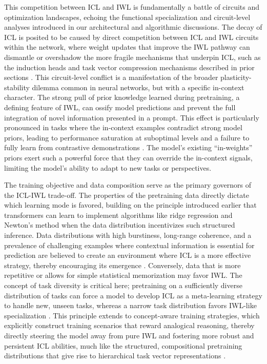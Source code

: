 \documentclass[11pt]{article}
\begin{document}
This competition between ICL and IWL is fundamentally a battle of circuits and optimization landscapes, echoing the functional specialization and circuit-level analyses introduced in our architectural and algorithmic discussions. The decay of ICL is posited to be caused by direct competition between ICL and IWL circuits within the network, where weight updates that improve the IWL pathway can dismantle or overshadow the more fragile mechanisms that underpin ICL, such as the induction heads and task vector compression mechanisms described in prior sections \cite{ref73}. This circuit-level conflict is a manifestation of the broader plasticity-stability dilemma common in neural networks, but with a specific in-context character. The strong pull of prior knowledge learned during pretraining, a defining feature of IWL, can ossify model predictions and prevent the full integration of novel information presented in a prompt. This effect is particularly pronounced in tasks where the in-context examples contradict strong model priors, leading to performance saturation at suboptimal levels and a failure to fully learn from contrastive demonstrations \cite{ref29}. The model's existing ``in-weights'' priors exert such a powerful force that they can override the in-context signals, limiting the model's ability to adapt to new tasks or perspectives.

The training objective and data composition serve as the primary governors of the ICL-IWL trade-off. The properties of the pretraining data directly dictate which learning mode is favored, building on the principle introduced earlier that transformers can learn to implement algorithms like ridge regression and Newton's method when the data distribution incentivizes such structured inference. Data distributions with high burstiness, long-range coherence, and a prevalence of challenging examples where contextual information is essential for prediction are believed to create an environment where ICL is a more effective strategy, thereby encouraging its emergence \cite{ref41}. Conversely, data that is more repetitive or allows for simple statistical memorization may favor IWL. The concept of task diversity is critical here; pretraining on a sufficiently diverse distribution of tasks can force a model to develop ICL as a meta-learning strategy to handle new, unseen tasks, whereas a narrow task distribution favors IWL-like specialization \cite{ref48}. This principle extends to concept-aware training strategies, which explicitly construct training scenarios that reward analogical reasoning, thereby directly steering the model away from pure IWL and fostering more robust and persistent ICL abilities, much like the structured, compositional pretraining distributions that give rise to hierarchical task vector representations \cite{ref68}.
\end{document}
